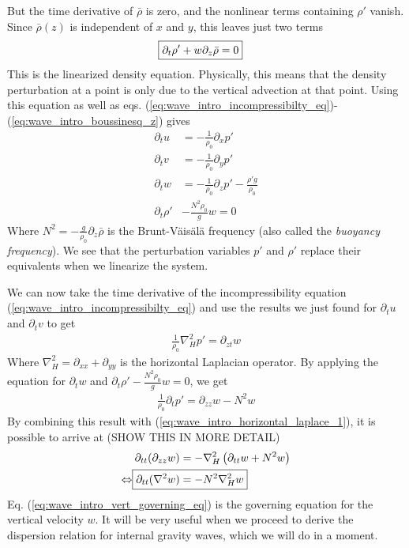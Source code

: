 \documentclass[a4paper, 12pt]{article}
\numberwithin{equation}{subsubsection}
\begin{document}
But the time derivative of $\bar{\rho}$ is zero, and the nonlinear terms containing $\rho'$ vanish. Since $\bar{\rho}(z)$ is independent of $x$ and $y$, this leaves just two terms
\begin{align}
	\Aboxed{\partial_t \rho' + w \partial_z \bar{\rho} = 0} \label{eq:wave_intro_density_eq_linearized}
\end{align}
This is the linearized density equation. Physically, this means that the density perturbation at a point is only due to the vertical advection at that point. Using this equation as well as eqs. (\ref{eq:wave_intro_incompressibilty_eq})-(\ref{eq:wave_intro_boussinesq_z}) gives
\begin{align}
	\partial_t u &= - \frac{1}{\rho_0} \partial_x p' \\
	\partial_t v &= - \frac{1}{\rho_0} \partial_y p' \\
	\partial_t w &= - \frac{1}{\rho_0} \partial_z p' - \frac{\rho' g}{\rho_0} \\
	\partial_t \rho' &- \frac{N^2 \rho_0}{g} w = 0
\end{align}
Where $N^2 = - \frac{g}{\rho_0}\partial_z \bar{\rho}$ is the Brunt-Väisälä frequency (also called the \textit{buoyancy frequency}). We see that the perturbation variables $p'$ and $\rho'$ replace their equivalents when we linearize the system.

We can now take the time derivative of the incompressibility equation (\ref{eq:wave_intro_incompressibilty_eq}) and use the results we just found for $\partial_t u$ and $\partial_t v$ to get
\begin{align}
	\frac{1}{\rho_0} \nabla_H^2 p' = \partial_{zt} w \label{eq:wave_intro_horizontal_laplace_1}
\end{align}
Where $\nabla_H^2 = \partial_{xx} + \partial_{yy}$ is the horizontal Laplacian operator. By applying the equation for $\partial_t w$ and $\partial_t \rho' - \frac{N^2 \rho_0}{g} w = 0$, we get
\begin{align}
	\frac{1}{\rho_0} \partial_t p' = \partial_{zz} w - N^2 w
\end{align}
By combining this result with (\ref{eq:wave_intro_horizontal_laplace_1}), it is possible to arrive at (SHOW THIS IN MORE DETAIL)
\begin{align}
	\partial_{tt} (\partial_{zz} w) &= - \nabla_H^2 \left(\partial_{tt} w + N^2 w\right) \\
	\Leftrightarrow \Aboxed{ \partial_{tt} (\nabla^2 w) &= - N^2 \nabla_H^2 w } \label{eq:wave_intro_vert_governing_eq}
\end{align}
Eq. (\ref{eq:wave_intro_vert_governing_eq}) is the governing equation for the vertical velocity $w$. It will be very useful when we proceed to derive the dispersion relation for internal gravity waves, which we will do in a moment.
\end{document}
